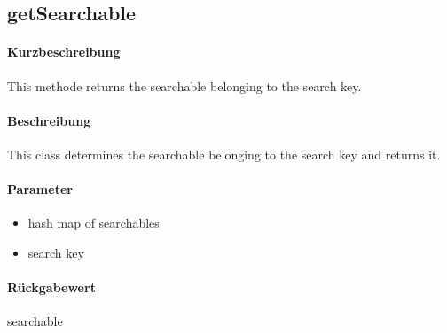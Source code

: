 \subsection{getSearchable}%
\paragraph*{Kurzbeschreibung}
This methode returns the searchable belonging to the search key.
\paragraph*{Beschreibung}
This class determines the searchable belonging to the search key and returns it.
\paragraph*{Parameter}
\begin{itemize}
    \item hash map of searchables
    \item search key
\end{itemize}
\paragraph*{Rückgabewert}
searchable